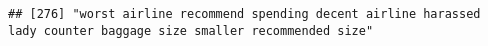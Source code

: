 \documentclass[
]{article}
\begin{document}
\begin{verbatim}
## [276] "worst airline recommend spending decent airline harassed lady counter baggage size smaller recommended size"                                                                                                                                                                                                                                                                                                                                                                                                                                                                                                                                                                                                                                                                                                                                                                                                                                                                                                                                                                                                                                                                                                                                                                                                                                                                                                                                                                                                                                                                                                                                                                                                                                                                                   

\end{verbatim}
\end{document}
